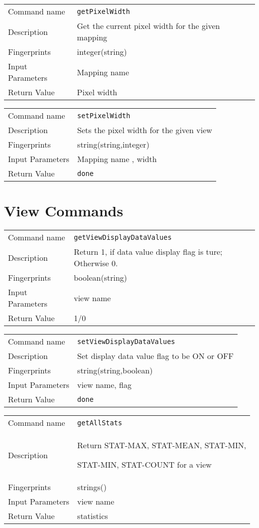 \noindent
\begin{tabular}{l|p{5in}}
\hline
Command name &{\tt getPixelWidth }\\ 
Description &
 Get the current pixel width for the given mapping 
 	\\
Fingerprints & integer(string)\\
Input Parameters& Mapping name \\
Return Value& Pixel width \\
\hline
\end{tabular}
\bigskip

\noindent
\begin{tabular}{l|p{5in}}
\hline
Command name &{\tt setPixelWidth }\\ 
Description &
 Sets the pixel width for the given view 
 	\\
Fingerprints & string(string,integer)\\
Input Parameters& Mapping name , width \\
Return Value&{\tt done}\\
\hline
\end{tabular}
\bigskip


\section{View Commands}
\noindent
\begin{tabular}{l|p{5in}}
\hline
Command name &{\tt getViewDisplayDataValues }\\ 
Description &
Return 1, if data value display flag is ture; Otherwise 0. 
 	\\
Fingerprints & boolean(string)\\
Input Parameters&view name\\
Return Value&1/0\\
\hline
\end{tabular}
\bigskip

\noindent
\begin{tabular}{l|p{5in}}
\hline
Command name &{\tt setViewDisplayDataValues }\\ 
Description &
Set display data value flag to be ON or OFF
 	\\
Fingerprints & string(string,boolean)\\
Input Parameters&view name, flag\\
Return Value&{\tt done}\\
\hline
\end{tabular}
\bigskip

\noindent
\begin{tabular}{l|p{5in}}
\hline
Command name &{\tt getAllStats }\\ 
Description &
Return STAT-MAX, STAT-MEAN, STAT-MIN, 
 
STAT-MIN, STAT-COUNT for a view
 	\\
Fingerprints & strings()\\
Input Parameters&view name\\
Return Value&statistics\\
\hline
\end{tabular}
\bigskip

